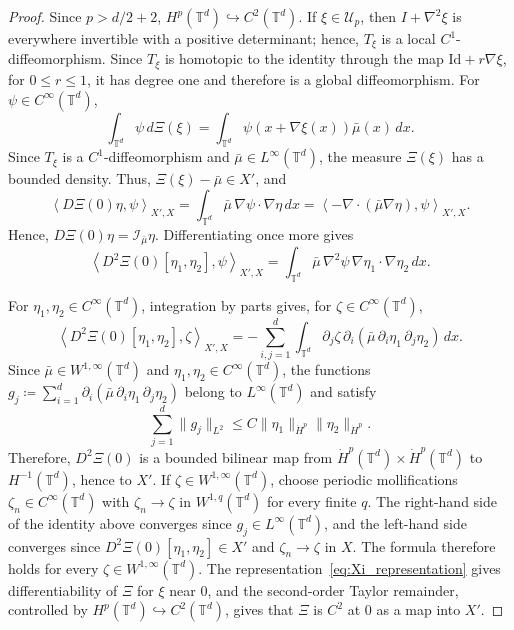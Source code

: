 \documentclass[11pt]{article}
\numberwithin{equation}{section}
\theoremstyle{definition}
\newcommand{\T}{\mathbb{T}}
\newcommand{\rieszmap}[1][\mu]{\mathcal{I}_{#1}}
\newcommand{\dotHk}[1][k]{\dot{H}^{#1}}
\begin{document}
\begin{proof}
    Since $p > d/2 + 2$, $H^p(\T^d) \hookrightarrow C^2(\T^d)$. 
    If $\xi \in \mathcal{U}_p$, then $I + \nabla^2\xi$ is everywhere invertible with a positive determinant; hence, $T_\xi$ is a local $C^1$-diffeomorphism. 
    Since $T_\xi$ is homotopic to the identity through the map $\mathrm{Id} + r\nabla\xi$, for $0 \le r \le 1$, it has degree one and therefore is a global diffeomorphism.
    For $\psi \in C^{\infty}(\T^d)$,
    \begin{equation}
        \label{eq:Xi_representation}
        \int_{\T^d} \psi \, d\Xi(\xi) = \int_{\T^d} \psi(x + \nabla\xi(x)) \bar\mu(x) \, dx.
    \end{equation}
    Since $T_\xi$ is a $C^1$-diffeomorphism and $\bar\mu \in L^\infty(\T^d)$, the measure $\Xi(\xi)$ has a bounded density.
    Thus, $\Xi(\xi) - \bar\mu \in X'$, and
    \[
    \left\langle D\Xi(0)\eta, \psi\right\rangle_{X',X} = \int_{\T^d}\bar\mu\,\nabla\psi\cdot\nabla\eta\,dx = \left\langle -\nabla\cdot(\bar\mu\nabla\eta),\psi\right\rangle_{X',X}.
    \]
    Hence, $D\Xi(0)\eta = \rieszmap[\bar\mu]\eta$.
    Differentiating once more gives
    \[
    \left\langle D^2\Xi(0)[\eta_1,\eta_2], \psi \right\rangle_{X',X} = \int_{\T^d} \bar\mu \,\nabla^2\psi \, \nabla\eta_1 \cdot \nabla\eta_2 \, dx.
    \]

    For $\eta_1, \eta_2 \in C^\infty(\T^d)$, integration by parts gives, for $\zeta \in C^{\infty}(\T^d)$,
    \[
    \left\langle D^2\Xi(0)[\eta_1,\eta_2], \zeta \right\rangle_{X',X} = -\sum_{i,j=1}^d \int_{\T^d}\partial_j\zeta \, \partial_i(\bar\mu \,\partial_i \eta_1 \, \partial_j\eta_2)\,dx.
    \]
    Since $\bar\mu \in W^{1,\infty}(\T^d)$ and $\eta_1, \eta_2 \in C^\infty(\T^d)$, the functions $g_j \coloneqq \sum_{i=1}^d \partial_i (\bar\mu\,\partial_i\eta_1\,\partial_j\eta_2)$ belong to $L^\infty(\T^d)$ and satisfy
    \[
    \sum_{j=1}^d\|g_j\|_{L^2} \le C\|\eta_1\|_{\dotHk[p]}\|\eta_2\|_{\dotHk[p]}.
    \]
    Therefore, $D^2\Xi(0)$ is a bounded bilinear map from $\dotHk[p](\T^d) \times \dotHk[p](\T^d)$ to $H^{-1}(\T^d)$, hence to $X'$.
    If $\zeta \in W^{1,\infty}(\T^d)$, choose periodic mollifications $\zeta_n \in C^\infty(\T^d)$ with $\zeta_n \to \zeta$ in $W^{1,q}(\T^d)$ for every finite $q$. 
    The right-hand side of the identity above converges since $g_j \in L^\infty(\T^d)$, and the left-hand side converges since $D^2\Xi(0)[\eta_1,\eta_2] \in X'$ and $\zeta_n \to \zeta$ in $X$.
    The formula therefore holds for every $\zeta \in W^{1,\infty}(\T^d)$.
    The representation~\eqref{eq:Xi_representation} gives differentiability of $\Xi$ for $\xi$ near $0$, and the second-order Taylor remainder, controlled by $H^p(\T^d) \hookrightarrow C^2(\T^d)$, gives that $\Xi$ is $C^2$ at $0$ as a map into $X'$.
\end{proof}
\end{document}
